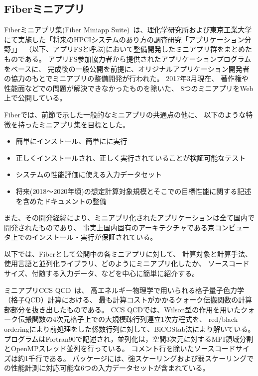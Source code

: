 \subsection{Fiberミニアプリ}
Fiberミニアプリ集(Fiber Miniapp Suite)~\cite{Fiber}は、理化学研究所および東京工業大学にて実施した「将来のHPCIシステムのあり方の調査研究「アプリケーション分野」」~\cite{ApliFS}（以下、アプリFSと呼ぶ)において整備開発したミニアプリ群をまとめたものである。
アプリFS参加協力者から提供されたアプリケーションプログラムをベースに、
完成後の一般公開を前提に、オリジナルアプリケーション開発者の協力のもとでミニアプリの整備開発が行われた。
2017年3月現在、
著作権や性能面などでの問題が解決できなかったものを除いた、
8つのミニアプリをWeb上で公開している。

Fiberでは、前節で示した一般的なミニアプリの共通点の他に、
以下のような特徴を持ったミニアプリ集を目標とした。

\begin{itemize}
\item 簡単にインストール、簡単にに実行
\item 正しくインストールされ、正しく実行されていることが検証可能なテスト
\item システムの性能評価に使える入力データセット
\item 将来(2018〜2020年頃)の想定計算対象規模とそこでの目標性能に関する記述を含めたドキュメントの整備
\end{itemize}

また、その開発経緯により、ミニアプリ化されたアプリケーションは全て国内で開発されたものであり、
事実上国内固有のアーキテクチャである京コンピュータ上でのインストール・実行が保証されている。

以下では、Fiberとして公開中の各ミニアプリに対して、
計算対象と計算手法、使用言語と並列化ライブラリ、どのようにミニアプリ化したか、
ソースコードサイズ、付随する入力データ、などを中心に簡単に紹介する。

ミニアプリCCS QCD~\cite{CCS-QCD_boku2012}\cite{CCS-QCD_terai2013}は、
高エネルギー物理学で用いられる格子量子色力学（格子QCD）計算における、
最も計算コストがかかるクォーク伝搬関数の計算部部分を抜き出したものである。
CCS QCDでは、Wilson型の作用を用いたクォーク伝搬関数の4次元格子上での大規模疎行列連立1次方程式を、
red/black orderingにより前処理をした係数行列に対して、BiCGStab法により解いている。
プログラムはFortran90で記述され，並列化は，空間3次元に対するMPI領域分割とOpenMPスレッド並列を行っている。
コメント行を除いたソースコードサイズは約1千行である。
パッケージには、強スケーリングおよび弱スケーリングでの性能計測に対応可能な6つの入力データセットが含まれている。


